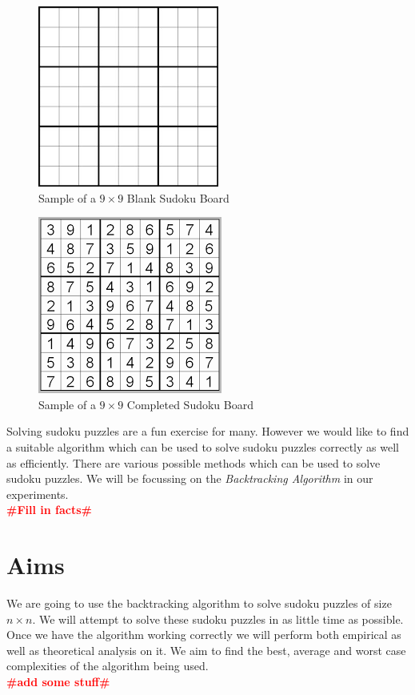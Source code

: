 \documentclass[12pt,a4paper,titlepage]{article}
\newcommand{\todo}[1]{\textcolor{red}{\textbf{\##1\#}}}
\begin{document}
\begin{figure}[h]
\centering
\includegraphics[scale=0.5]{Blank_Sudoku_Board}
\caption{Sample of a $9\times9$ Blank Sudoku Board}
\label{fig:Blank_Sudoku_Board}
\end{figure}
\begin{figure}[h]
\centering
\includegraphics[scale=0.5]{Complete_Sudoku_Board}
\caption{Sample of a $9\times9$ Completed Sudoku Board}
\label{fig:Complete_Sudoku_Board}
\end{figure}

\noindent
Solving sudoku puzzles are a fun exercise for many. However we would like to find a suitable algorithm which can be used to solve sudoku puzzles correctly as well as efficiently. There are various possible methods which can be used to solve sudoku puzzles. We will be focussing on the \emph{Backtracking Algorithm} in our experiments.
\\
\todo{Fill in facts}

\newpage
\section{Aims}

We are going to use the backtracking algorithm to solve sudoku puzzles of size $n\times n$. We will attempt to solve these sudoku
puzzles in as little time as possible. Once we have the algorithm working correctly we will perform both empirical as well as
theoretical analysis on it. We aim to find the best, average and worst case complexities of the algorithm being used.
\\
\todo{add some stuff}
\end{document}
